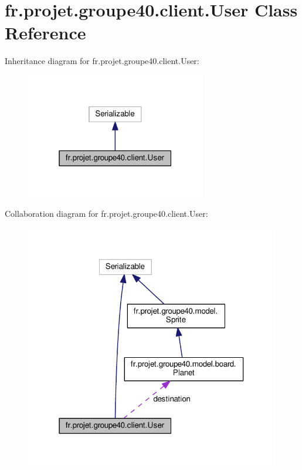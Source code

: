 \hypertarget{classfr_1_1projet_1_1groupe40_1_1client_1_1_user}{}\section{fr.\+projet.\+groupe40.\+client.\+User Class Reference}
\label{classfr_1_1projet_1_1groupe40_1_1client_1_1_user}


Inheritance diagram for fr.\+projet.\+groupe40.\+client.\+User\+:\nopagebreak
\begin{figure}[H]
\begin{center}
\leavevmode
\includegraphics[width=223pt]{classfr_1_1projet_1_1groupe40_1_1client_1_1_user__inherit__graph}
\end{center}
\end{figure}


Collaboration diagram for fr.\+projet.\+groupe40.\+client.\+User\+:\nopagebreak
\begin{figure}[H]
\begin{center}
\leavevmode
\includegraphics[width=316pt]{classfr_1_1projet_1_1groupe40_1_1client_1_1_user__coll__graph}
\end{center}
\end{figure}
